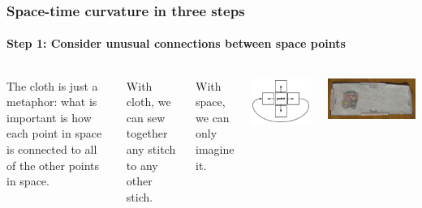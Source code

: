 \documentclass[compress]{beamer}
\begin{document}
\begin{frame}
\frametitle{Space-time curvature in three steps}
\framesubtitle{Step 1: Consider unusual connections between space points}

\begin{columns}

The cloth is just a metaphor: what is important is how each point in space is connected to all of the other points in space.

\vspace{0.1 cm}
With cloth, we can sew together any stitch to any other stich.

\vspace{0.1 cm}
With space, we can only imagine it.

\vspace{0.25 cm}
\includegraphics[width=\linewidth]{pictures/looped_connections.png}

\includegraphics[width=\linewidth]{pictures/dungeon_room.jpg}


\end{columns}
\end{frame}
\end{document}
